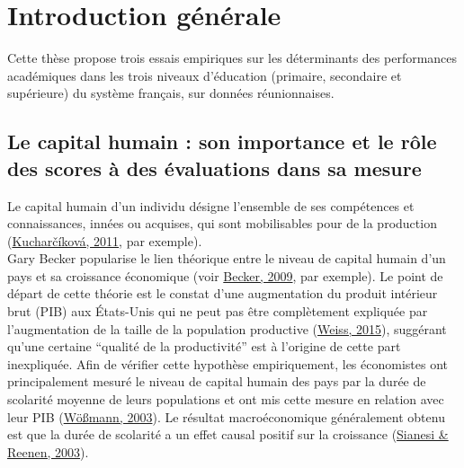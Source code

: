 \documentclass[
]{book}
\begin{document}
\hypertarget{introduction-guxe9nuxe9rale}{%
\chapter*{Introduction générale}\label{introduction-guxe9nuxe9rale}}

Cette thèse propose trois essais empiriques sur les déterminants des performances académiques dans les trois niveaux d'éducation (primaire, secondaire et supérieure) du système français, sur données réunionnaises.

\hypertarget{le-capital-humain-son-importance-et-le-ruxf4le-des-scores-uxe0-des-uxe9valuations-dans-sa-mesure}{%
\section*{Le capital humain : son importance et le rôle des scores à des évaluations dans sa mesure}\label{le-capital-humain-son-importance-et-le-ruxf4le-des-scores-uxe0-des-uxe9valuations-dans-sa-mesure}}

Le capital humain d'un individu désigne l'ensemble de ses compétences et connaissances, innées ou acquises, qui sont mobilisables pour de la production (\protect\hyperlink{ref-KUC:11}{Kucharčíková, 2011}, par exemple).\\
Gary Becker popularise le lien théorique entre le niveau de capital humain d'un pays et sa croissance économique (voir \protect\hyperlink{ref-BEC:09}{Becker, 2009}, par exemple). Le point de départ de cette théorie est le constat d'une augmentation du produit intérieur brut (PIB) aux États-Unis qui ne peut pas être complètement expliquée par l'augmentation de la taille de la population productive (\protect\hyperlink{ref-WEI:15}{Weiss, 2015}), suggérant qu'une certaine ``qualité de la productivité'' est à l'origine de cette part inexpliquée. Afin de vérifier cette hypothèse empiriquement, les économistes ont principalement mesuré le niveau de capital humain des pays par la durée de scolarité moyenne de leurs populations et ont mis cette mesure en relation avec leur PIB (\protect\hyperlink{ref-WOE:03}{Wößmann, 2003}). Le résultat macroéconomique généralement obtenu est que la durée de scolarité a un effet causal positif sur la croissance (\protect\hyperlink{ref-SIA:REE:03}{Sianesi \& Reenen, 2003}).
\end{document}
